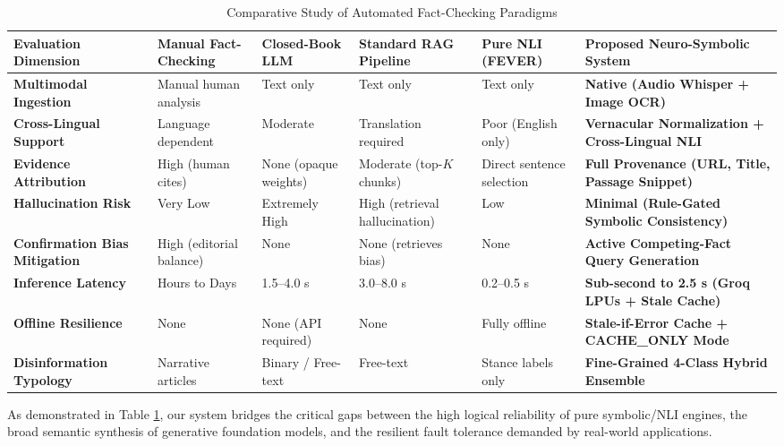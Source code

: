 \documentclass[12pt,a4paper]{report}
\begin{document}
\begin{table}[h!]
\centering
\small
\caption{Comparative Study of Automated Fact-Checking Paradigms}
\label{tab:comparative_study}
\begin{tabular}{|m{2.8cm}|m{2.0cm}|m{2.0cm}|m{2.2cm}|m{2.2cm}|m{3.0cm}|}
\hline
\textbf{Evaluation Dimension} & \textbf{Manual Fact-Checking} & \textbf{Closed-Book LLM} & \textbf{Standard RAG Pipeline} & \textbf{Pure NLI (FEVER)} & \textbf{Proposed Neuro-Symbolic System} \\
\hline
\textbf{Multimodal Ingestion} & Manual human analysis & Text only & Text only & Text only & \textbf{Native (Audio Whisper + Image OCR)} \\
\hline
\textbf{Cross-Lingual Support} & Language dependent & Moderate & Translation required & Poor (English only) & \textbf{Vernacular Normalization + Cross-Lingual NLI} \\
\hline
\textbf{Evidence Attribution} & High (human cites) & None (opaque weights) & Moderate (top-$K$ chunks) & Direct sentence selection & \textbf{Full Provenance (URL, Title, Passage Snippet)} \\
\hline
\textbf{Hallucination Risk} & Very Low & Extremely High & High (retrieval hallucination) & Low & \textbf{Minimal (Rule-Gated Symbolic Consistency)} \\
\hline
\textbf{Confirmation Bias Mitigation} & High (editorial balance) & None & None (retrieves bias) & None & \textbf{Active Competing-Fact Query Generation} \\
\hline
\textbf{Inference Latency} & Hours to Days & 1.5--4.0 s & 3.0--8.0 s & 0.2--0.5 s & \textbf{Sub-second to 2.5 s (Groq LPUs + Stale Cache)} \\
\hline
\textbf{Offline Resilience} & None & None (API required) & None & Fully offline & \textbf{Stale-if-Error Cache + CACHE\_ONLY Mode} \\
\hline
\textbf{Disinformation Typology} & Narrative articles & Binary / Free-text & Free-text & Stance labels only & \textbf{Fine-Grained 4-Class Hybrid Ensemble} \\
\hline
\end{tabular}
\end{table}

As demonstrated in Table \ref{tab:comparative_study}, our system bridges the critical gaps between the high logical reliability of pure symbolic/NLI engines, the broad semantic synthesis of generative foundation models, and the resilient fault tolerance demanded by real-world applications.
\end{document}
